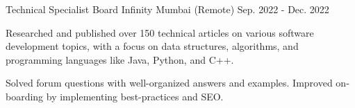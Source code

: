 


\begin{cventries}

  \cventry
    {Technical Specialist} %
    {Board Infinity} %
    {Mumbai (Remote)} %
    {Sep. 2022 - Dec. 2022} %
    {
      \begin{cvitems} %
        \item {Researched and published over 150 technical articles on various software development topics, with a focus on data structures, algorithms, and programming languages like Java, Python, and C++.}
        \item {Solved forum questions with well-organized answers and examples. Improved on-boarding by implementing best-practices and SEO.}
      \end{cvitems}
    }



\end{cventries}

